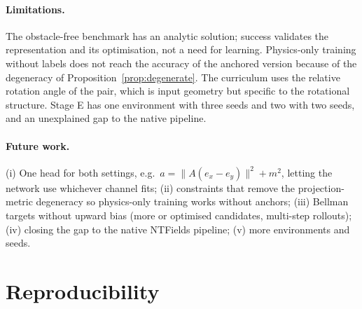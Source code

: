 \documentclass[11pt]{article}
\begin{document}
\paragraph{Limitations.} The obstacle-free benchmark has an analytic solution; success validates the
representation and its optimisation, not a need for learning. Physics-only training without labels
does not reach the accuracy of the anchored version because of the degeneracy of
Proposition~\ref{prop:degenerate}. The curriculum uses the relative rotation angle of the pair, which
is input geometry but specific to the rotational structure. Stage E has one environment with three
seeds and two with two seeds, and an unexplained gap to the native pipeline.

\paragraph{Future work.} (i) One head for both settings, e.g.\ $a=\|A(e_x-e_y)\|^2+m^2$, letting the
network use whichever channel fits; (ii) constraints that remove the projection-metric degeneracy so
physics-only training works without anchors; (iii) Bellman targets without upward bias (more or
optimised candidates, multi-step rollouts); (iv) closing the gap to the native NTFields pipeline;
(v) more environments and seeds.

\section{Reproducibility}
\end{document}
